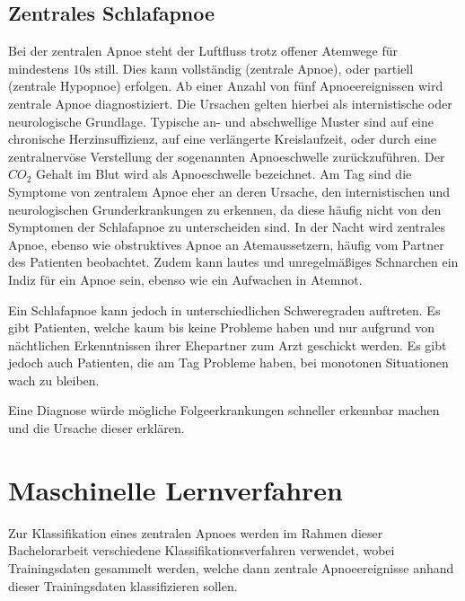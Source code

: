 \subsection{Zentrales Schlafapnoe}
\label{ch:Basics:se:apnoe}
Bei der zentralen Apnoe steht der Luftfluss trotz offener Atemwege für mindestens $10\si{\s}$ still. 
Dies kann vollständig (zentrale Apnoe), oder partiell (zentrale Hypopnoe) erfolgen. 
Ab einer Anzahl von fünf Apnoeereignissen wird zentrale Apnoe diagnostiziert.
Die Ursachen gelten hierbei als internistische oder neurologische Grundlage.
Typische an- und abschwellige Muster sind auf eine chronische Herzinsuffizienz, auf eine verlängerte Kreislaufzeit, oder durch eine zentralnervöse Verstellung der sogenannten Apnoeschwelle zurückzuführen.
Der $CO_2$ Gehalt im Blut wird als Apnoeschwelle bezeichnet.
Am Tag sind die Symptome von zentralem Apnoe eher an deren Ursache, den internistischen und neurologischen Grunderkrankungen zu erkennen, da diese häufig nicht von den Symptomen der Schlafapnoe zu unterscheiden sind. 
In der Nacht wird zentrales Apnoe, ebenso wie obstruktives Apnoe an Atemaussetzern, häufig vom Partner des Patienten beobachtet.
Zudem kann lautes und unregelmäßiges Schnarchen ein Indiz für ein Apnoe sein, ebenso wie ein Aufwachen in Atemnot.

Ein Schlafapnoe kann jedoch in unterschiedlichen Schweregraden auftreten. 
Es gibt Patienten, welche kaum bis keine Probleme haben und nur aufgrund von nächtlichen Erkenntnissen ihrer Ehepartner zum Arzt geschickt werden. 
Es gibt jedoch auch Patienten, die am Tag Probleme haben, bei monotonen Situationen wach zu bleiben.

Eine Diagnose würde mögliche Folgeerkrankungen schneller erkennbar machen und die Ursache dieser erklären.

\section{Maschinelle Lernverfahren}
\label{ch:Basics:se:ml}
Zur Klassifikation eines zentralen Apnoes werden im Rahmen dieser Bachelorarbeit verschiedene Klassifikationsverfahren verwendet, wobei Trainingsdaten gesammelt werden, welche dann zentrale Apnoeereignisse anhand dieser Trainingsdaten klassifizieren sollen.

